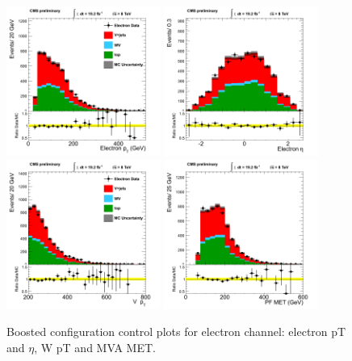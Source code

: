 \begin{figure}[htbp]
\centering
\includegraphics[width=0.45\textwidth]{figs/n-1_plots_el/el_W_elec_pt.png}
\includegraphics[width=0.45\textwidth]{figs/n-1_plots_el/el_W_elec_eta.png}\\
\includegraphics[width=0.45\textwidth]{figs/n-1_plots_el/el_W_pt.png}
\includegraphics[width=0.45\textwidth]{figs/n-1_plots_el/el_event_met_pfmet.png}
\caption{Boosted configuration control plots for electron channel: electron pT and $\eta$, W pT and MVA MET.}
\label{fig:control_boosted_el}
\end{figure}

